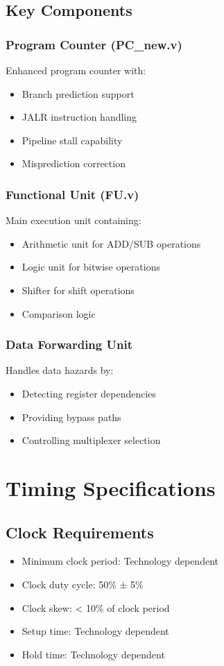 \documentclass[11pt,a4paper]{article}
\begin{document}
\subsection{Key Components}

\subsubsection{Program Counter (PC\_new.v)}
Enhanced program counter with:
\begin{itemize}
    \item Branch prediction support
    \item JALR instruction handling
    \item Pipeline stall capability
    \item Misprediction correction
\end{itemize}

\subsubsection{Functional Unit (FU.v)}
Main execution unit containing:
\begin{itemize}
    \item Arithmetic unit for ADD/SUB operations
    \item Logic unit for bitwise operations
    \item Shifter for shift operations
    \item Comparison logic
\end{itemize}

\subsubsection{Data Forwarding Unit}
Handles data hazards by:
\begin{itemize}
    \item Detecting register dependencies
    \item Providing bypass paths
    \item Controlling multiplexer selection
\end{itemize}

\section{Timing Specifications}

\subsection{Clock Requirements}
\begin{itemize}
    \item Minimum clock period: Technology dependent
    \item Clock duty cycle: 50\% ± 5\%
    \item Clock skew: < 10\% of clock period
    \item Setup time: Technology dependent
    \item Hold time: Technology dependent
\end{itemize}
\end{document}
